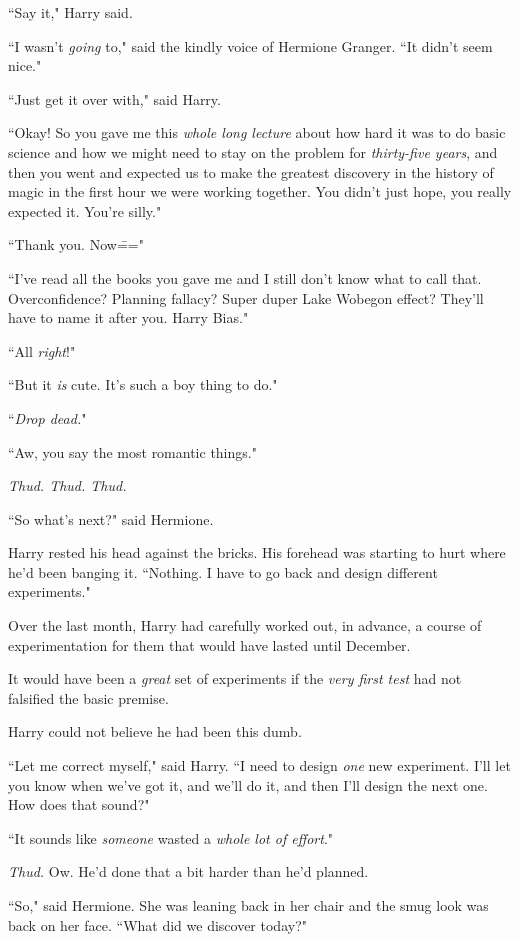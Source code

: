 ``Say it," Harry said.

``I wasn't \emph{going} to," said the kindly voice of Hermione Granger. ``It didn't seem nice."

``Just get it over with," said Harry.

``Okay! So you gave me this \emph{whole long lecture} about how hard it was to do basic science and how we might need to stay on the problem for \emph{thirty-five years}, and then you went and expected us to make the greatest discovery in the history of magic in the first hour we were working together. You didn't just hope, you really expected it. You're silly."

``Thank you. Now\==="

``I've read all the books you gave me and I still don't know what to call that. Overconfidence? Planning fallacy? Super duper Lake Wobegon effect? They'll have to name it after you. Harry Bias."

``All \emph{right}!"

``But it \emph{is} cute. It's such a boy thing to do."

``\emph{Drop dead.}"

``Aw, you say the most romantic things."

\emph{Thud. Thud. Thud.}

``So what's next?" said Hermione.

Harry rested his head against the bricks. His forehead was starting to hurt where he'd been banging it. ``Nothing. I have to go back and design different experiments."

Over the last month, Harry had carefully worked out, in advance, a course of experimentation for them that would have lasted until December.

It would have been a \emph{great} set of experiments if the \emph{very first test} had not falsified the basic premise.

Harry could not believe he had been this dumb.

``Let me correct myself," said Harry. ``I need to design \emph{one} new experiment. I'll let you know when we've got it, and we'll do it, and then I'll design the next one. How does that sound?"

``It sounds like \emph{someone} wasted a \emph{whole lot of effort}."

\emph{Thud.} Ow. He'd done that a bit harder than he'd planned.

``So," said Hermione. She was leaning back in her chair and the smug look was back on her face. ``What did we discover today?"

